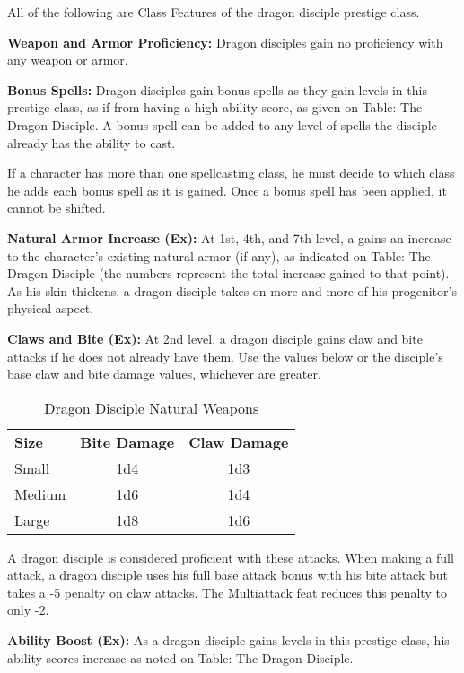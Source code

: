 \ClassFeatures

All of the following are Class Features of the dragon disciple prestige class.

\textbf{Weapon and Armor Proficiency:} Dragon disciples gain no proficiency with 
any weapon or armor.

\textbf{Bonus Spells:} Dragon disciples gain bonus spells as they gain levels in 
this prestige class, as if from having a high ability score, as given on Table: 
The Dragon Disciple. A bonus spell can be added to any level of spells the disciple 
already has the ability to cast.

If a character has more than one spellcasting class, he must decide to which class 
he adds each bonus spell as it is gained. Once a bonus spell has been applied, 
it cannot be shifted.

\textbf{Natural Armor Increase (Ex):} At 1st, 4th, and 7th level, a gains an increase 
to the character's existing natural armor (if any), as indicated on Table: The 
Dragon Disciple (the numbers represent the total increase gained to that point). 
As his skin thickens, a dragon disciple takes on more and more of his progenitor's 
physical aspect.

\textbf{Claws and Bite (Ex):} At 2nd level, a dragon disciple gains claw and bite 
attacks if he does not already have them. Use the values below or the disciple's 
base claw and bite damage values, whichever are greater.

\begin{table}[htb]
\caption{Dragon Disciple Natural Weapons}
\centering
\begin{tabular}{l c c}
\textbf{Size} & \textbf{Bite Damage} & \textbf{Claw Damage}\\
Small & 1d4 & 1d3\\
Medium & 1d6 & 1d4\\
Large & 1d8 & 1d6\\
\end{tabular}
\end{table}

A dragon disciple is considered proficient with these attacks. When making a full 
attack, a dragon disciple uses his full base attack bonus with his bite attack 
but takes a -5 penalty on claw attacks. The Multiattack feat reduces this penalty 
to only -2.

\textbf{Ability Boost (Ex):} As a dragon disciple gains levels in this prestige 
class, his ability scores increase as noted on Table: The Dragon Disciple.

